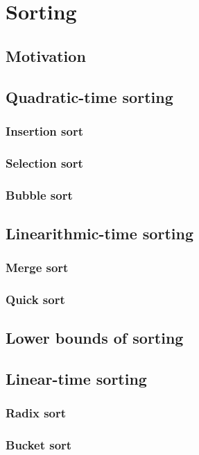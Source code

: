 \chapter{Sorting}
\label{chap:sorting}

\section{Motivation}

\section{Quadratic-time sorting}
\subsection{Insertion sort}
\subsection{Selection sort}
\subsection{Bubble sort}

\section{Linearithmic-time sorting}
\subsection{Merge sort}
\subsection{Quick sort}

\section{Lower bounds of sorting}

\section{Linear-time sorting}
\subsection{Radix sort}
\subsection{Bucket sort}